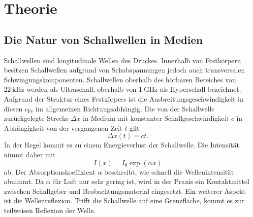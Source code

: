 
\section{Theorie}
\label{sec:Theorie}
\subsection{Die Natur von Schallwellen in Medien}
Schallwellen sind longitudinale Wellen des Druckes.
 Innerhalb von Festkörpern besitzen Schallwellen
aufgrund von Schubspannungen jedoch auch transversalen Schwingungskomponenten.
Schallwellen oberhalb des hörbaren Bereiches von $\SI{22}{\kilo\hertz}$ werden als
Ultraschall, oberhalb von $\SI{1}{\giga\hertz}$ als Hyperschall bezeichnet.
Aufgrund der Struktur eines Festkörpers ist die Ausbreitungsgeschwindigkeit in  diesen $c_\text{Fe}$ im allgemeinen Richtungsabhängig.
Die von der Schallwelle zurückgelegte Strecke $\Delta x$ in Medium mit konstanter Schallgeschwindigkeit $c$ in Abhängigkeit von der vergangenen Zeit $t$ gilt
\begin{equation}
	\Delta x (t)= c t \label{MIST}\text{.}
\end{equation}
In der Regel kommt es zu einem Energieverlust der Schallwelle. Die Intensität nimmt daher mit
\begin{equation}
  I\left(x\right) = I_0 \exp\left(\alpha x\right)\label{I}
\end{equation}
ab. Der Absorptionskoeffizient $\alpha$ beschreibt, wie schnell die Wellenintensität
abnimmt. Da $\alpha$ für Luft nur sehr gering ist, wird in der Praxis ein Kontaktmittel
zwischen Schallgeber und Beobachtungsmaterial eingesetzt. Ein weiterer Aspekt ist die Wellenreflexion.
Trifft die Schallwelle auf eine Grenzfläche, kommt es zur teilweisen Reflexion der Welle.

